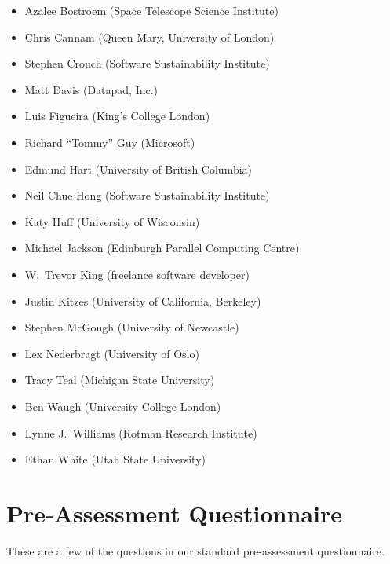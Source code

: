 \documentclass[10pt,a4paper,twocolumn]{article}
\begin{document}
\begin{itemize}
\item
  Azalee Bostroem (Space Telescope Science Institute)
\item
  Chris Cannam (Queen Mary, University of London)
\item
  Stephen Crouch (Software Sustainability Institute)
\item
  Matt Davis (Datapad, Inc.)
\item
  Luis Figueira (King's College London)
\item
  Richard ``Tommy'' Guy (Microsoft)
\item
  Edmund Hart (University of British Columbia)
\item
  Neil Chue Hong (Software Sustainability Institute)
\item
  Katy Huff (University of Wisconsin)
\item
  Michael Jackson (Edinburgh Parallel Computing Centre)
\item
  W.\ Trevor King (freelance software developer)
\item
  Justin Kitzes (University of California, Berkeley)
\item
  Stephen McGough (University of Newcastle)
\item
  Lex Nederbragt (University of Oslo)
\item
  Tracy Teal (Michigan State University)
\item
  Ben Waugh (University College London)
\item
  Lynne J.\ Williams (Rotman Research Institute)
\item
  Ethan White (Utah State University)
\end{itemize}

\nocite{*}
{\small
}

\appendix

\section{Pre-Assessment Questionnaire}

These are a few of the questions in our standard pre-assessment questionnaire.
\end{document}
